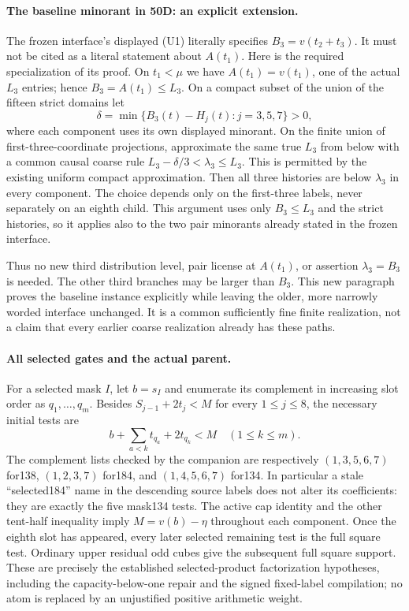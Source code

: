 \paragraph{The baseline minorant in 50D: an explicit extension.}
The frozen interface's displayed (U1) literally specifies
$B_3=v(t_2+t_3)$. It must not be cited as a literal statement about
$A(t_1)$. Here is the required specialization of its proof.
On $t_1<\mu$ we have $A(t_1)=v(t_1)$, one of the actual $L_3$
entries; hence $B_3=A(t_1)\le L_3$. On a compact subset of the
union of the fifteen strict domains let
\[
 \delta=\min\{B_3(t)-H_j(t):j=3,5,7\}>0,
\]
where each component uses its own displayed minorant. On the finite
union of first-three-coordinate projections, approximate the same
true $L_3$ from below with a common causal coarse rule
$L_3-\delta/3<\lambda_3\le L_3$. This is permitted by the existing
uniform compact approximation. Then all three histories are below
$\lambda_3$ in every component. The choice depends only on the
first-three labels, never separately on an eighth child. This argument
uses only $B_3\le L_3$ and the strict histories, so it applies also to
the two pair minorants already stated in the frozen interface.

Thus no new third distribution level, pair license at $A(t_1)$, or
assertion $\lambda_3=B_3$ is needed. The other third branches may be
larger than $B_3$. This new paragraph proves the baseline instance
explicitly while leaving the older, more narrowly worded interface
unchanged. It is a common sufficiently fine finite realization, not
a claim that every earlier coarse realization already has these paths.

\paragraph{All selected gates and the actual parent.}
For a selected mask $I$, let $b=s_I$ and enumerate its complement
in increasing slot order as $q_1,\ldots,q_m$. Besides
$S_{j-1}+2t_j<M$ for every $1\le j\le8$, the necessary initial tests are
\[
 b+\sum_{a<k}t_{q_a}+2t_{q_k}<M\quad(1\le k\le m).
\]
The complement lists checked by the companion are respectively
$(1,3,5,6,7)$ for138, $(1,2,3,7)$ for184, and $(1,4,5,6,7)$
for134. In particular a stale ``selected184'' name in the descending
source labels does not alter its coefficients: they are exactly the
five mask134 tests. The active cap identity and the other tent-half
inequality imply $M=v(b)-\eta$ throughout each component.
Once the eighth slot has appeared, every later selected remaining
test is the full square test. Ordinary upper residual odd cubes
give the subsequent full square support. These are precisely the
established selected-product factorization hypotheses, including
the capacity-below-one repair and the signed fixed-label compilation;
no atom is replaced by an unjustified positive arithmetic weight.

